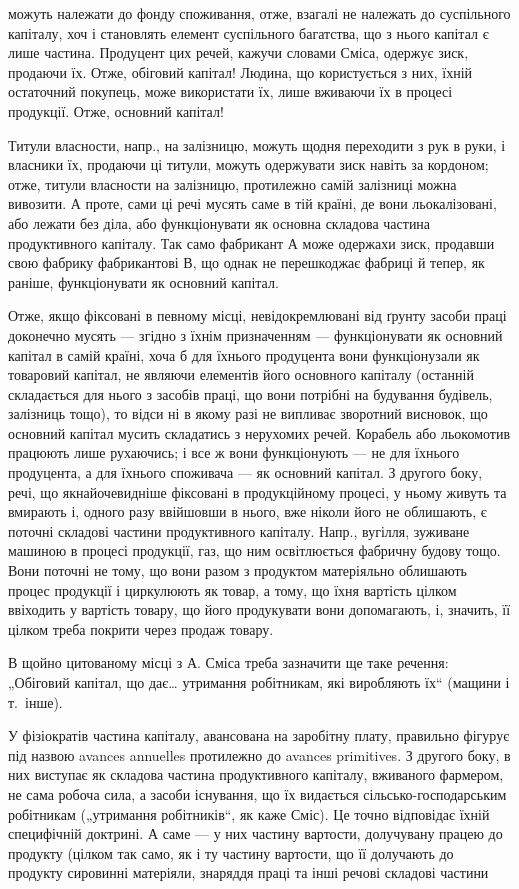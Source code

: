 \parcont{}  %
можуть належати до фонду споживання, отже, взагалі не належать до
суспільного капіталу, хоч і становлять елемент суспільного багатства, що
з нього капітал є лише частина. Продуцент цих речей, кажучи словами
Сміса, одержує зиск, продаючи їх. Отже, обіговий капітал! Людина, що
користується з них, їхній остаточний покупець, може використати їх, лише
вживаючи їх в процесі продукції. Отже, основний капітал!

Титули власности, напр., на залізницю, можуть щодня переходити з
рук в руки, і власники їх, продаючи ці титули, можуть одержувати зиск
навіть за кордоном; отже, титули власности на залізницю, протилежно
самій залізниці можна вивозити. А проте, сами ці речі мусять саме в тій
країні, де вони льокалізовані, або лежати без діла, або функціонувати як
основна складова частина продуктивного капіталу. Так само фабрикант
$А$ може одержахи зиск, продавши свою фабрику фабрикантові $В$, що однак
не перешкоджає фабриці й тепер, як раніше, функціонувати як основний
капітал.

Отже, якщо фіксовані в певному місці, невідокремлювані від ґрунту
засоби праці доконечно мусять — згідно з їхнім призначенням — функціонувати
як основний капітал в самій країні, хоча б для їхнього продуцента
вони функціонузали як товаровий капітал, не являючи елементів його
основного капіталу (останній складається для нього з засобів праці, що
вони потрібні на будування будівель, залізниць тощо), то відси ні в
якому разі не випливає зворотний висновок, що основний капітал мусить
складатись з нерухомих речей. Корабель або льокомотив працюють
лише рухаючись; і все ж вони функціонують — не для їхнього продуцента,
а для їхнього споживача — як основний капітал. З другого боку,
речі, що якнайочевидніше фіксовані в продукційному процесі, у ньому
живуть та вмирають і, одного разу ввійшовши в нього, вже ніколи його
не облишають, є поточні складові частини продуктивного капіталу. Напр.,
вугілля, зуживане машиною в процесі продукції, газ, що ним освітлюється
фабричну будову тощо. Вони поточні не тому, що вони разом з
продуктом матеріяльно облишають процес продукції і циркулюють як
товар, а тому, що їхня вартість цілком ввіходить у вартість товару, що
його продукувати вони допомагають, і, значить, її цілком треба покрити
через продаж товару.

В щойно цитованому місці з А. Сміса треба зазначити ще таке речення:
„Обіговий капітал, що дає\dots{} утримання робітникам, які виробляють
їх“ (мащини і т.~інше).

У фізіократів частина капіталу, авансована на заробітну плату, правильно
фігурує під назвою avances annuelles протилежно до avances primitives.
З другого боку, в них виступає як складова частина продуктивного
капіталу, вживаного фармером, не сама робоча сила, а засоби існування,
що їх видається сільсько-господарським робітникам („утримання
робітників“, як каже Сміс). Це точно відповідає їхній специфічній доктрині.
А саме — у них частину вартости, долучувану працею до продукту
(цілком так само, як і ту частину вартости, що її долучають до продукту
сировинні матеріяли, знаряддя праці та інші речові складові частини
\parbreak{}  %
